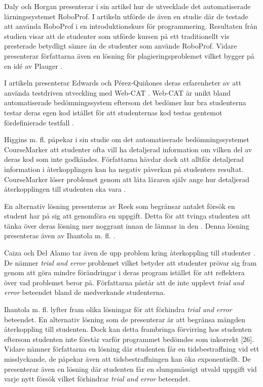 \documentclass[a4paper,11pt]{article}
\begin{document}
{Daly och Horgan \cite{roboprof_4} presenterar i sin artikel hur de utvecklade det automatiserade lärningssystemet RoboProf\cite{roboprof_4}. I artikeln utförde de även en studie där de testade att använda RoboProf i en introduktionskurs för programmering. Resultaten från studien visar att de studenter som utförde kursen på ett traditionellt vis presterade betydligt sämre än de studenter som använde RoboProf. Vidare presenterar författarna även en lösning för plagieringsproblemet vilket bygger på en idé av Plauger \cite{plaguer_5}.

I artikeln \cite{edwards_15} presenterar Edwards och Pérez-Quiñones deras erfarenheter av att använda testdriven utveckling med Web-CAT \cite{edwards_15}. Web-CAT är unikt bland automatiserade bedömningssystem eftersom det bedömer hur bra studenterna testar deras egen kod istället för att studenternas kod testas gentemot fördefinierade testfall \cite{edwards_15}.

Higgins m. fl. \cite{higgins_3} påpekar i sin studie om det automatiserade bedömningssystemet CourseMarker \cite{higgins_coursemarker_12} att studenter ofta vill ha detaljerad information om vilken del av deras kod som inte godkändes. Författarna hävdar dock att alltför detaljerad information i återkopplingen kan ha negativ påverkan på studenters resultat. CourseMarker löser problemet genom att låta läraren själv ange hur detaljerad återkopplingen till studenten ska vara \cite{higgins_3} \cite{caiza_7} \cite{douce_11}.

En alternativ lösning presenteras av Reek som begränsar antalet försök en student har på sig att genomföra en uppgift. Detta för att tvinga studenten att tänka över deras lösning mer noggrant innan de lämnar in den \cite{reek_6}. Denna lösning presenteras även av Ihantola m. fl. \cite{ihantola}.

Caiza och Del Alamo tar även de upp problem kring återkoppling till studenter \cite{caiza_7}. De nämner \textit{trial and error} problemet vilket betyder att studenter prövar sig fram genom att göra mindre förändringar i deras program istället för att reflektera över vad problemet beror på. Författarna påstår att de inte upplevt \textit{trial and error} beteendet bland de medverkande studenterna.

Ihantola m. fl. \cite{ihantola} lyfter fram olika lösningar för att förhindra \textit{trial and error} beteendet.  En alternativ lösning som de presenterar är att begränsa mängden återkoppling till studenten. Dock kan detta frambringa förvirring hos studenten eftersom studenten inte förstår varför programmet bedömdes som inkorrekt [26]. Vidare nämner författarna en lösning där studenten får en tidsbestraffning vid ett misslyckande, de påpekar även att tidsbestraffningen kan öka exponentiellt.
De presenterar även en lösning där studenten får en slumpmässigt utvald uppgift vid varje nytt försök vilket förhindrar \textit{trial and error} beteendet. 

}
\end{document}
